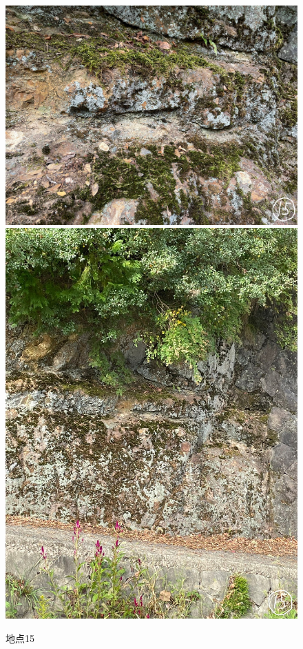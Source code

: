 \documentclass[uplatex,b5paper]{jsreport}
\begin{document}
  \begin{figure}[h]
    \begin{center}
      \includegraphics[scale=0.1]{files/地学実習/地点15_1.jpg}
      \includegraphics[scale=0.15]{files/地学実習/地点15_2.jpg}
      \caption{地点15}
    \end{center}
  \end{figure}
  \clearpage
\end{document}
